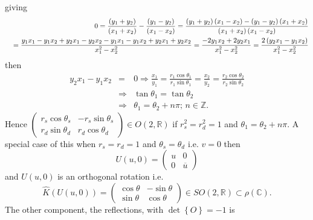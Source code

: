 \documentclass[aps,preprint]{revtex4}
\begin{document}
giving 
\begin{eqnarray}
&&0=\frac{\left( y_{1}+y_{2}\right) }{\left( x_{1}+x_{2}\right) }-\frac{%
\left( y_{1}-y_{2}\right) }{\left( x_{1}-x_{2}\right) }=\frac{\left(
y_{1}+y_{2}\right) \left( x_{1}-x_{2}\right) -\left( y_{1}-y_{2}\right)
\left( x_{1}+x_{2}\right) }{\left( x_{1}+x_{2}\right) \left(
x_{1}-x_{2}\right) } \\
&&\left. =\right. \frac{%
y_{1}x_{1}-y_{1}x_{2}+y_{2}x_{1}-y_{2}x_{2}-y_{1}x_{1}-y_{1}x_{2}+y_{2}x_{1}+y_{2}x_{2}%
}{x_{1}^{2}-x_{2}^{2}}=\frac{-2y_{1}x_{2}+2y_{2}x_{1}}{x_{1}^{2}-x_{2}^{2}}=%
\frac{2\left( y_{2}x_{1}-y_{1}x_{2}\right) }{x_{1}^{2}-x_{2}^{2}}
\end{eqnarray}%
then%
\begin{eqnarray}
y_{2}x_{1}-y_{1}x_{2} &=&0\Rightarrow \frac{x_{1}}{y_{1}}=\frac{r_{1}\cos
\theta _{1}}{r_{1}\sin \theta _{1}}=\frac{x_{2}}{y_{2}}=\frac{r_{2}\cos
\theta _{2}}{r_{2}\sin \theta _{2}} \\
&\Rightarrow &\tan \theta _{1}=\tan \theta _{2} \\
&\Rightarrow &\theta _{1}=\theta _{2}+n\pi ;\,n\in \mathbb{Z}.
\end{eqnarray}%
Hence $\left( 
\begin{array}{cc}
r_{s}\cos \theta _{s} & -r_{s}\sin \theta _{s} \\ 
r_{d}\sin \theta _{d} & r_{d}\cos \theta _{d}%
\end{array}%
\right) \in O\left( 2,\mathbb{R}\right) $ if $r_{s}^{2}=r_{d}^{2}=1$ and $%
\theta _{1}=\theta _{2}+n\pi $. A special case of this when $r_{s}=r_{d}=1$
and $\theta _{s}=\theta _{d}$ i.e. $v=0$ then 
\begin{equation}
U\left( u,0\right) =\left( 
\begin{array}{cc}
u & 0 \\ 
0 & \overline{u}%
\end{array}%
\right)
\end{equation}%
and $U\left( u,0\right) $ is an orthogonal rotation i.e. 
\begin{equation}
\widehat{K}\left( U\left( u,0\right) \right) =\left( 
\begin{array}{cc}
\cos \theta & -\sin \theta \\ 
\sin \theta & \cos \theta%
\end{array}%
\right) \in SO\left( 2,\mathbb{R}\right) \subset \rho \left( \mathbb{C}%
\right) .
\end{equation}%
The other component, the reflections, with $\det \left\{ O\right\} =-1$ is
\end{document}
